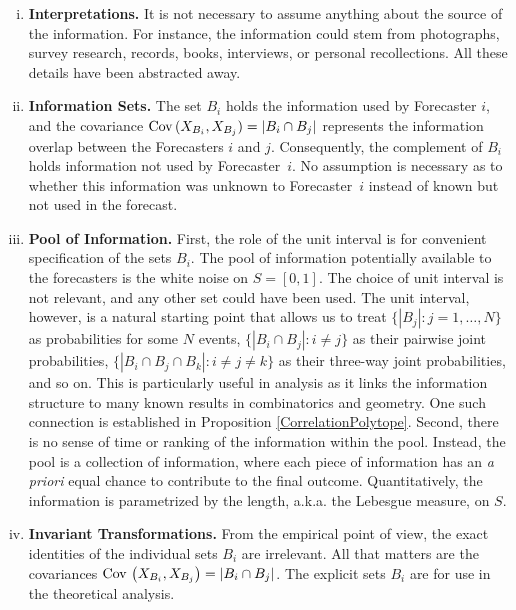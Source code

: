 \documentclass[11pt]{article}
\theoremstyle{definition}
\theoremstyle{definition}
\def\Cov{{\rm Cov}\,}
\begin{document}
\begin{enumerate}[(i)]
\item {\bf Interpretations.} It is not necessary to assume anything 
about the source of the information.  For instance, the information 
could stem from photographs, survey research, records, books, 
interviews, or personal recollections.  All these details have 
been abstracted away.

\item {\bf Information Sets.} The set $B_i$ holds the information used
by Forecaster $i$, and the covariance $\Cov (X_{B_i} , X_{B_j}) = |B_{i} \cap B_{j}|$
represents the information overlap between the Forecasters $i$ and
$j$.
Consequently, the complement of $B_i$ holds information not used by
Forecaster~$i$.  No assumption is necessary as to whether this
information was unknown to Forecaster~$i$ instead of known but not
used in the forecast.


\item {\bf Pool of Information.} First, the role of the unit interval
is for convenient specification of the sets $B_i$. The pool of
information potentially available to the forecasters is the white
noise on $S = [0,1]$. The choice of unit interval is not relevant, and
any other set could have been used. The unit interval, however, is a
natural starting point that allows us to treat $\{ |B_j| : j = 1,
\dots, N\}$ as probabilities for some $N$ events, $\{ |B_i \cap B_j| :
i \neq j\}$ as their pairwise joint probabilities, $\{ |B_i \cap B_j
\cap B_k| : i \neq j \neq k\}$ as their three-way joint probabilities,
and so on.  This is particularly useful in analysis as it links the
information structure to many known results in combinatorics and geometry. One such connection is
established in Proposition \ref{CorrelationPolytope}. Second, there is
no sense of time or ranking of the information within the
pool. Instead, the pool is a collection of information, where each
piece of information has an {\em a priori} equal chance to contribute
to the final outcome.  Quantitatively, the information is parametrized
by the length, a.k.a. the Lebesgue measure, on $S$.
\label{item:pool}


\item {\bf Invariant Transformations.}  From the empirical point of
view, the exact identities of the individual sets $B_i$ are
irrelevant.  All that matters are the covariances $\Cov \left(X_{B_i}
, X_{B_j}\right) = |B_i \cap B_j|$.  The explicit sets $B_i$ are for
use in the theoretical analysis.


\end{enumerate}
\end{document}
